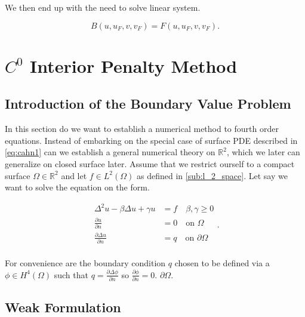 We then end up with the need to solve linear system.

\begin{equation}
\label{eq:3f }
B\left( u, u_{F} , v, v_{F} \right) = F\left( u, u_{F}, v, v_{F} \right)
.\end{equation}






\section{$C^0$ Interior Penalty Method}
\label{sec:ch1}

\subsection{Introduction of the Boundary Value Problem}%
\label{sub:introduction_of_the_bvp}


In this section do we want to establish a numerical method to fourth order equations. Instead of embarking on the
special case of surface PDE described in \eqref{eq:cahn1} can we establish a general numerical theory on $\mathbb{R} ^2$, which we later can generalize on closed surface later. Assume that we restrict ourself to a compact surface $\Omega \in \mathbb{R} ^2 $ and let $f \in L^{2}\left( \Omega
\right) $ as defined in \ref{sub:l_2_space}.
Let say we want to solve the equation on the form.

\begin{equation}
\label{eq:ch1_bvp}
\begin{split}
    \Delta ^2 u - \beta \Delta u + \gamma u &= f \quad \beta , \gamma \ge 0 \\
    \frac{\partial u}{\partial  n}  &= 0 \quad \text{on }\Omega  \\
    \frac{\partial \Delta u}{\partial  n}  &= q \quad \text{on } \partial \Omega  \\
\end{split}
.\end{equation}

For convenience are the boundary condition $q$ chosen to be defined via a  $\phi \in H^{4}\left( \Omega  \right)$
such that $q = \frac{\partial \Delta \phi }{\partial  n} $ so $\frac{\partial \phi }{\partial  n}  = 0$.
$\partial \Omega $.


\subsection{Weak Formulation}%
\label{sub:weak_formulation}

